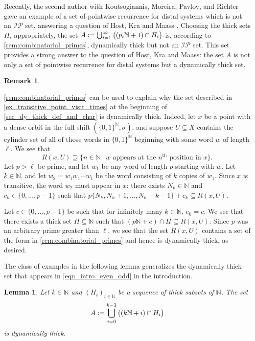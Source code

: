 \documentclass[letter,11pt]{article}
\theoremstyle{plain}
\newtheorem{lemma}[theorem]{Lemma}
\theoremstyle{definition}
\newtheorem{remark}[theorem]{Remark}
\theoremstyle{plain}
\theoremstyle{plain}
\numberwithin{equation}{section}
\newcommand{\N}{\mathbb{N}}
\newcommand{\defeq}{\vcentcolon=}
\newcommand{\IP}{\mathcal{IP}}
\begin{document}
Recently, the second author with Koutsogiannis, Moreira, Pavlov, and Richter \cite{Koutsogiannis_Le_Moreira_Pavlov_Richter_interpolation_sets} gave an example of a set of pointwise recurrence for distal systems which is not an $\IP$ set, answering a question of Host, Kra and Maass \cite[Question 3.11]{HostKraMaass2016}. Choosing the thick sets $H_i$ appropriately, the set $A \defeq \bigcup_{i=1}^\infty \big((p_i \N + 1) \cap H_i \big)$ is, according to \cref{rem:combinatorial_primes}, dynamically thick but not an $\IP$ set.  This set provides a strong answer to the question of Host, Kra and Maass: the set $A$ is not only a set of pointwise recurrence for distal systems but a dynamically thick set.


\begin{remark}
\label{rmk_transitive_point_visit_times}
\label{rmk_why_transitive_works}

\cref{rem:combinatorial_primes} can be used to explain why the set described in \eqref{ex_transitive_point_visit_times} at the beginning of \cref{sec_dy_thick_def_and_char} is dynamically thick.  Indeed, let $x$ be a point with a dense orbit in the full shift $(\{0, 1\}^{\N},\sigma)$, and suppose $U \subseteq X$ contains the cylinder set of all of those words in $\{0,1\}^{\N}$ beginning with some word $w$ of length $\ell$. We see that
\[R(x,U) \supseteq \{n \in \N \ | \ w \text{ appears at the $n^{\text{th}}$ position in } x\}.\]
Let $p > \ell$ be prime, and let $w_1$ be any word of length $p$ starting with $w$. Let $k \in \N$, and let $w_2 = w_1 w_1 \cdots w_1$ be the word consisting of $k$ copies of $w_1$. Since $x$ is transitive, the word $w_2$ must appear in $x$: there exists $N_k \in \N$ and $c_k \in \{0, \ldots, p-1\}$ such that $p \{N_k, N_k+1, \ldots, N_k+k - 1\} + c_k \subseteq R(x,U)$.

Let $c \in \{0, \ldots, p-1\}$ be such that for infinitely many $k \in \N$, $c_k = c$.  We see that there exists a thick set $H \subseteq \N$ such that $(p \N + c) \cap H \subseteq R(x,U)$.  Since $p$ was an arbitrary prime greater than $\ell$, we see that the set $R(x,U)$ contains a set of the form in \cref{rem:combinatorial_primes} and hence is dynamically thick, as desired.
\end{remark}


The class of examples in the following lemma generalizes the dynamically thick set that appears in \eqref{eqn_intro_even_odd} in the introduction.

\begin{lemma}
\label{ex:type2-special}
    Let $k \in \N$ and $(H_i)_{i \in \N}$ be a sequence of thick subsets of $\N$. The set
    \[A \defeq \bigcup_{i=0}^{k-1} \big ((k \N  + i) \cap H_i \big)\]
    is dynamically thick.
\end{lemma}
\end{document}
